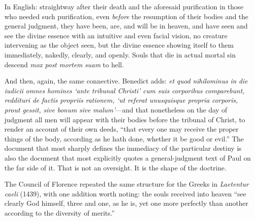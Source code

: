 In English: straightway after their death and the aforesaid purification in those who needed such purification, even \emph{before} the resumption of their bodies and the general judgment, they have been, are, and will be in heaven, and have seen and see the divine essence with an intuitive and even facial vision, no creature intervening as the object seen, but the divine essence showing itself to them immediately, nakedly, clearly, and openly. Souls that die in actual mortal sin descend \emph{mox post mortem suam} to hell.

And then, again, the same connective. Benedict adds: \emph{et quod nihilominus in die iudicii omnes homines `ante tribunal Christi' cum suis corporibus comparebunt, reddituri de factis propriis rationem, `ut referat unusquisque propria corporis, prout gessit, sive bonum sive malum'}---and that nonetheless on the day of judgment all men will appear with their bodies before the tribunal of Christ, to render an account of their own deeds, ``that every one may receive the proper things of the body, according as he hath done, whether it be good or evil.'' The document that most sharply defines the immediacy of the particular destiny is also the document that most explicitly quotes a general-judgment text of Paul on the far side of it. That is not an oversight. It is the shape of the doctrine.

The Council of Florence repeated the same structure for the Greeks in \emph{Laetentur caeli} (1439), with one addition worth noting: the souls received into heaven ``see clearly God himself, three and one, as he is, yet one more perfectly than another according to the diversity of merits.''

